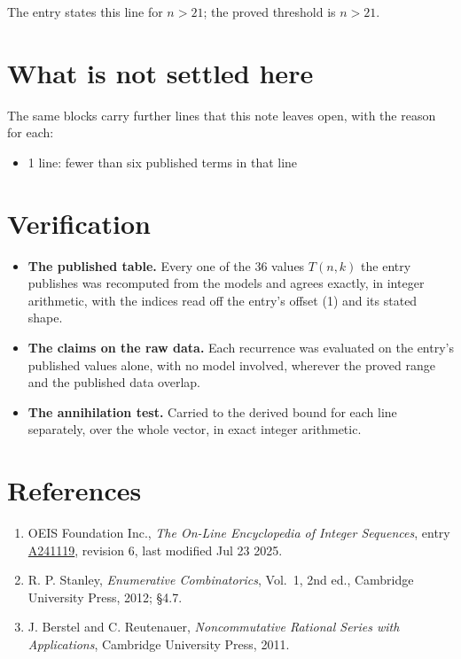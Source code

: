 \documentclass[11pt]{article}
\theoremstyle{definition}
\begin{document}
The entry states this line for $n > 21$; the proved threshold is $n > 21$.

\section{What is not settled here}

The same blocks carry further lines that this note leaves open, with the reason for each:

\begin{itemize}

\item 1 line: fewer than six published terms in that line

\end{itemize}

\section{Verification}

\begin{itemize}

\item {\bfseries The published table.} Every one of the 36 values $T(n,k)$ the entry publishes was recomputed from the models and agrees exactly, in integer arithmetic, with the indices read off the entry's offset (1) and its stated shape.

\item {\bfseries The claims on the raw data.} Each recurrence was evaluated on the entry's published values alone, with no model involved, wherever the proved range and the published data overlap.

\item {\bfseries The annihilation test.} Carried to the derived bound for each line separately, over the whole vector, in exact integer arithmetic.

\end{itemize}

\section{References}

\begin{enumerate}

\item OEIS Foundation Inc., \emph{The On-Line Encyclopedia of Integer Sequences}, entry \href{https://oeis.org/A241119}{A241119}, revision 6, last modified Jul 23 2025.

\item R. P. Stanley, \emph{Enumerative Combinatorics}, Vol.~1, 2nd ed., Cambridge University Press, 2012; \S4.7.

\item J. Berstel and C. Reutenauer, \emph{Noncommutative Rational Series with Applications}, Cambridge University Press, 2011.

\end{enumerate}
\end{document}
